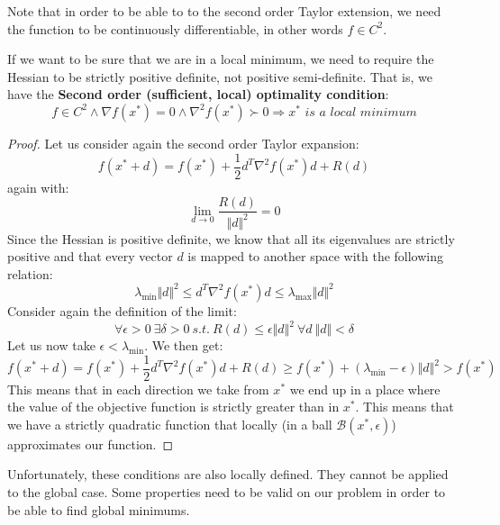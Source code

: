 \par Note that in order to be able to to the second order Taylor extension, we need the function to be continuously differentiable, in other words $f \in C^2$.
\par If we want to be sure that we are in a local minimum, we need to require the Hessian to be strictly positive definite, not positive semi-definite. That is, we have the \textbf{Second order (sufficient, local) optimality condition}:
\begin{equation}
    f \in C^2 \wedge \nabla f(x^*) = 0 \wedge \nabla^2 f(x^*) \succ 0 \Rightarrow x^* \textit{ is a local minimum}
\end{equation}
\begin{proof}
Let us consider again the second order Taylor expansion:
\begin{equation}
    f(x^* + d) = f(x^*) + \frac{1}{2} d^T \nabla^2 f(x^*) d + R(d)
\end{equation}
again with:
\begin{equation}
    \lim_{d \rightarrow 0} \frac{R(d)}{\Vert d \Vert^2} = 0
\end{equation}
Since the Hessian is positive definite, we know that all its eigenvalues are strictly positive and that every vector $d$ is mapped to another space with the following relation:
\begin{equation}
    \lambda_{\min} \Vert d \Vert^2 \leq d^T \nabla^2 f(x^*) d \leq \lambda_{\max} \Vert d \Vert^2
\end{equation}
Consider again the definition of the limit:
\begin{equation}
    \forall \epsilon > 0\ \exists \delta > 0\ s.t.\ R(d) \leq \epsilon \Vert d \Vert^2\ \forall d\ \Vert d \Vert < \delta
\end{equation}
Let us now take $\epsilon < \lambda_{\min}$. We then get:
\begin{equation}
    f(x^* + d) = f(x^*) + \frac{1}{2} d^T \nabla^2 f(x^*) d + R(d) \geq f(x^*) + (\lambda_{\min} - \epsilon) \Vert d \Vert^2 > f(x^*)
\end{equation}
This means that in each direction we take from $x^*$ we end up in a place where the value of the objective function is strictly greater than in $x^*$.
This means that we have a strictly quadratic function that locally (in a ball $\mathcal{B}(x^*,\epsilon)$) approximates our function.
\end{proof}
\par Unfortunately, these conditions are also locally defined. They cannot be applied to the global case. Some properties need to be valid on our problem in order to be able to find global minimums.
%
%
%
